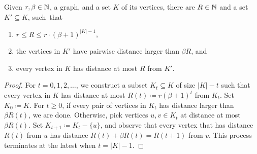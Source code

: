 \begin{lemma}\label{lem:vitali}
    Given $r,\beta\in\mathbb N$, a graph, and a set $K$ of its vertices, there are $R\in\mathbb N$ and a set \(K' \subseteq K\),
     such~that
    \begin{enumerate}
        \item $r\le R\le r\cdot (\beta+1)^{|K|-1}$, 
        \item the vertices in \(K'\) have pairwise distance larger than \(\beta R\), and 
        \item every vertex in \(K\) has distance at most \(R\) from \(K'\).
    \end{enumerate}
\end{lemma}
\begin{proof}
For  \(t=0,1,2,\ldots\), we construct a subset \( K_t \subseteq K \) of size \(|K|-t\)
such that every vertex in \(K\) has distance at most \(R(t)\coloneqq  r (\beta + 1)^{t} \) from \(K_t\).
Set \(K_0 \coloneqq  K\).
For $t\ge 0$, if every pair of vertices in \(K_t\) has distance larger than \(\beta R(t)\), we are done.
Otherwise, pick vertices \(u,v \in K_t\) at distance at most \(\beta R(t)\).
Set \(K_{t+1} \coloneqq  K_t - \{u\}\),
and observe that every vertex that has distance \(R(t)\) from \(u\) has distance \(R(t) + \beta R(t) = R(t+1)\) from \(v\).
This process terminates at the latest when \(t=|K|-1\). 
\end{proof}

